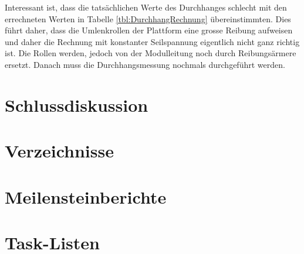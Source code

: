 \documentclass[a4paper]{report}
\begin{document}
Interessant ist, dass die tatsächlichen Werte des Durchhanges schlecht mit den errechneten Werten in Tabelle \ref{tbl:DurchhangRechnung} übereinstimmten. Dies führt daher, dass die Umlenkrollen der Plattform eine grosse Reibung aufweisen und daher die Rechnung mit konstanter Seilspannung eigentlich nicht ganz richtig ist. Die Rollen werden, jedoch von der Modulleitung noch durch Reibungsärmere ersetzt. Danach muss die Durchhangsmessung nochmals durchgeführt werden.

\chapter{Schlussdiskussion}

\chapter*{Verzeichnisse}

\listoffigures

\listoftables

\printbibliography

\appendix

\chapter{Meilensteinberichte}

\chapter{Task-Listen}
\end{document}

